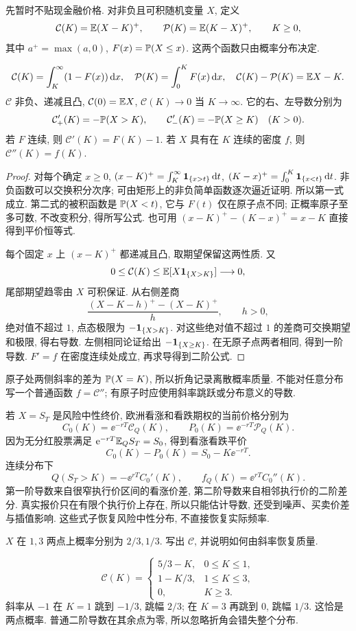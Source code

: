 先暂时不贴现金融价格. 对非负且可积随机变量 $X$, 定义
\[
 \mathcal C(K)=\mathbb E(X-K)^+,\qquad
 \mathcal P(K)=\mathbb E(K-X)^+,\qquad K\geq0,
\]
其中 $a^+=\max(a,0)$, $F(x)=\mathbb P(X\leq x)$. 这两个函数只由概率分布决定.

\begin{proposition}[尾积分与看涨函数]
\[
 \mathcal C(K)=\int_K^\infty(1-F(x))\,\mathrm d x,\quad
 \mathcal P(K)=\int_0^K F(x)\,\mathrm d x,\quad
 \mathcal C(K)-\mathcal P(K)=\mathbb E X-K.
\]
$\mathcal C$ 非负、递减且凸, $\mathcal C(0)=\mathbb E X$, $\mathcal C(K)\to0$ 当 $K\to\infty$. 它的右、左导数分别为
\[
 \mathcal C'_+(K)=-\mathbb P(X>K),\qquad
 \mathcal C'_-(K)=-\mathbb P(X\geq K)\quad(K>0).
\]
若 $F$ 连续, 则 $\mathcal C'(K)=F(K)-1$. 若 $X$ 具有在 $K$ 连续的密度 $f$, 则 $\mathcal C''(K)=f(K)$.
\end{proposition}
\begin{proof}
对每个确定 $x\geq0$,
$(x-K)^+=\int_K^\infty\mathbf 1_{\{x>t\}}\,\mathrm d t$,
$(K-x)^+=\int_0^K\mathbf 1_{\{x<t\}}\,\mathrm d t$.
非负函数可以交换积分次序; 可由矩形上的非负简单函数逐次逼近证明. 所以第一式成立. 第二式的被积函数是 $\mathbb P(X<t)$, 它与 $F(t)$ 仅在原子点不同; 正概率原子至多可数, 不改变积分, 得所写公式. 也可用
$(x-K)^+-(K-x)^+=x-K$ 直接得到平价恒等式.

每个固定 $x$ 上 $(x-K)^+$ 都递减且凸, 取期望保留这两性质. 又
\[
 0\leq\mathcal C(K)\leq\mathbb E[X\mathbf 1_{\{X>K\}}]\longrightarrow0,
\]
尾部期望趋零由 $X$ 可积保证. 从右侧差商
\[
 \frac{(X-K-h)^+-(X-K)^+}{h},\qquad h>0,
\]
绝对值不超过 $1$, 点态极限为 $-\mathbf 1_{\{X>K\}}$. 对这些绝对值不超过 $1$ 的差商可交换期望和极限, 得右导数. 左侧相同论证给出 $-\mathbf 1_{\{X\geq K\}}$. 在无原子点两者相同, 得到一阶导数. $F'=f$ 在密度连续处成立, 再求导得到二阶公式.
\end{proof}
原子处两侧斜率的差为 $\mathbb P(X=K)$, 所以折角记录离散概率质量. 不能对任意分布写一个普通函数 $f=\mathcal C''$; 有原子时应使用斜率跳跃或分布意义的导数.

若 $X=S_T$ 是风险中性终价, 欧洲看涨和看跌期权的当前价格分别为
\[
 C_0(K)=\ee^{-rT}\mathcal C_Q(K),\qquad
 P_0(K)=\ee^{-rT}\mathcal P_Q(K).
\]
因为无分红股票满足 $\mathrm e^{-rT}\mathbb E_QS_T=S_0$, 得到看涨看跌平价
\[
 C_0(K)-P_0(K)=S_0-K\ee^{-rT}.
\]
连续分布下
\[
 Q(S_T>K)=-\ee^{rT}C_0'(K),\qquad
 f_Q(K)=\ee^{rT}C_0''(K).
\]
第一阶导数来自很窄执行价区间的看涨价差, 第二阶导数来自相邻执行价的二阶差分. 真实报价只在有限个执行价上存在, 所以只能估计导数, 还受到噪声、买卖价差与插值影响. 这些式子恢复风险中性分布, 不直接恢复实际频率.

\begin{example}
$X$ 在 $1,3$ 两点上概率分别为 $2/3,1/3$. 写出 $\mathcal C$, 并说明如何由斜率恢复质量.
\end{example}
\begin{solution}
\[
 \mathcal C(K)=
 \begin{cases}
 5/3-K,&0\leq K\leq1,\\
 1-K/3,&1\leq K\leq3,\\
 0,&K\geq3.
 \end{cases}
\]
斜率从 $-1$ 在 $K=1$ 跳到 $-1/3$, 跳幅 $2/3$; 在 $K=3$ 再跳到 $0$, 跳幅 $1/3$. 这恰是两点概率. 普通二阶导数在其余点为零, 所以忽略折角会错失整个分布.
\end{solution}

